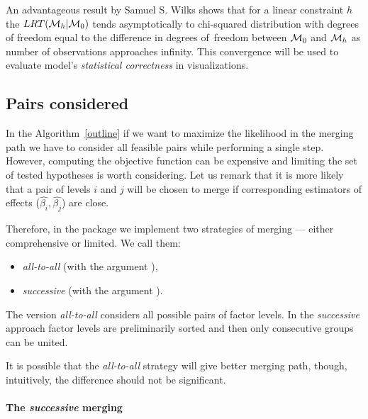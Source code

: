 An advantageous result by Samuel S. Wilks \citep{wilks1938large} shows that for a linear constraint $h$ the $LRT(\mathcal{M}_h|\mathcal{M}_0)$ tends asymptotically to chi-squared distribution with degrees of freedom equal to the difference in degrees of~freedom between $\mathcal{M}_0$ and $\mathcal{M}_h$ as number of observations approaches infinity. This convergence will be used to evaluate model's \emph{statistical correctness} in visualizations.



\subsection{Pairs considered}

In the Algorithm~\ref{outline} if we want to maximize the likelihood in the merging path we have to consider all feasible pairs while performing a single step. However, 
computing the objective function can be expensive and limiting the set of tested hypotheses is worth considering. Let us remark that it is more likely that a pair of levels $i$ and $j$ will be chosen to merge if corresponding estimators of effects ($\hat{\beta_i}, \hat{\beta_j}$) are close.


Therefore, in the package we implement two strategies of merging --- either comprehensive or limited. We call them:

\begin{itemize}
\item \emph{all-to-all} (with the argument ),
\item \emph{successive} (with the argument ).

\end{itemize}

The version \emph{all-to-all} considers all possible pairs of factor levels. In the \emph{successive} approach factor levels are preliminarily sorted and then only consecutive groups can be united. 

It is possible that the \emph{all-to-all} strategy will give better merging path, though, intuitively, the difference should not be significant.



\paragraph{The \emph{successive} merging}

